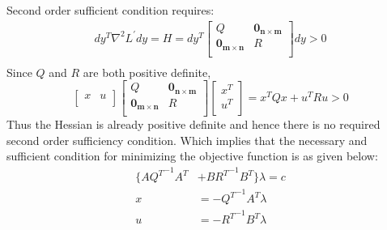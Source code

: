 \begin{enumerate}
  
  Second order sufficient condition requires:
  \begin{align*}
  dy^T \nabla^2 L^\prime dy = H = dy^T \begin{bmatrix}
                        Q & \mathbf{0_{n\times m}} \\
                       \mathbf{0_{m\times n}} &  R \\
                      \end{bmatrix} dy > 0\\
  \end{align*}
  Since  $Q$ and $R$ are both positive definite,
  \begin{equation*}
   \begin{bmatrix}
    x & u\\
   \end{bmatrix}
   \begin{bmatrix}
	Q & \mathbf{0_{n\times m}} \\
	\mathbf{0_{m\times n}} & R \\
   \end{bmatrix} 
   \begin{bmatrix}
    x^T \\
    u^T \\
   \end{bmatrix} = x^T  Q x + u^T R u > 0
  \end{equation*}
  Thus the Hessian is already positive definite and hence there is no required
second order sufficiency condition. Which implies that the necessary and
sufficient condition for minimizing the objective function is as given below:
  \begin{align*}
 \{ A  {Q^T}^{-1} A^T &+ B {R^T} ^{-1} B^T \} \lambda = c\\
  x &= -{Q^T}^{-1} A^T \lambda   \\
  u &= -{R^T}^{-1} B^T \lambda   \\
  \end{align*}


\end{enumerate}
